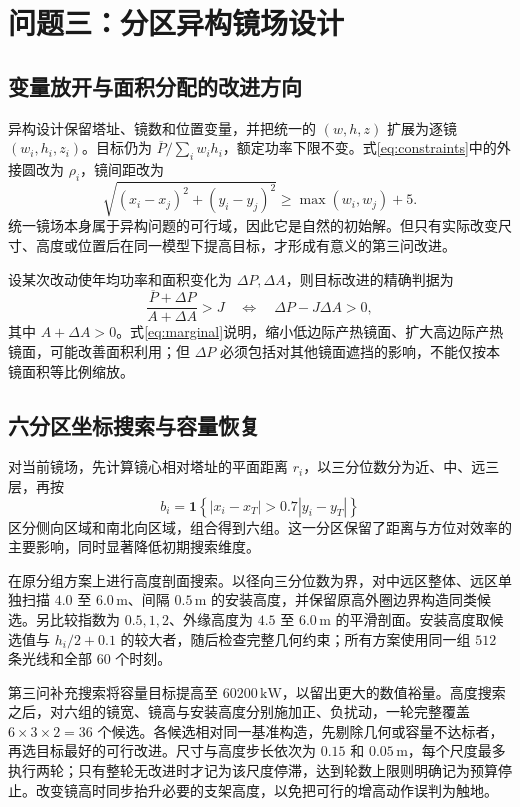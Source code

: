 \documentclass[UTF8,a4paper,zihao=-4,fontset=mac]{ctexart}
\newcommand{\mean}[1]{\overline{#1}}
\begin{document}
\section{问题三：分区异构镜场设计}
\subsection{变量放开与面积分配的改进方向}
异构设计保留塔址、镜数和位置变量，并把统一的 $(w,h,z)$ 扩展为逐镜 $(w_i,h_i,z_i)$。目标仍为 $\mean P/\sum_iw_ih_i$，额定功率下限不变。式\eqref{eq:constraints}中的外接圆改为 $\rho_i$，镜间距改为
\begin{equation}
\sqrt{(x_i-x_j)^2+(y_i-y_j)^2}\ge\max(w_i,w_j)+5.
\end{equation}
统一镜场本身属于异构问题的可行域，因此它是自然的初始解。但只有实际改变尺寸、高度或位置后在同一模型下提高目标，才形成有意义的第三问改进。

设某次改动使年均功率和面积变化为 $\Delta P,\Delta A$，则目标改进的精确判据为
\begin{equation}
\frac{\mean P+\Delta P}{A+\Delta A}>J
\quad\Longleftrightarrow\quad \Delta P-J\Delta A>0,
\label{eq:marginal}
\end{equation}
其中 $A+\Delta A>0$。式\eqref{eq:marginal}说明，缩小低边际产热镜面、扩大高边际产热镜面，可能改善面积利用；但 $\Delta P$ 必须包括对其他镜面遮挡的影响，不能仅按本镜面积等比例缩放。

\subsection{六分区坐标搜索与容量恢复}
对当前镜场，先计算镜心相对塔址的平面距离 $r_i$，以三分位数分为近、中、远三层，再按
\begin{equation}
b_i=\mathbf1\!\left\{|x_i-x_T|>0.7|y_i-y_T|\right\}
\end{equation}
区分侧向区域和南北向区域，组合得到六组。这一分区保留了距离与方位对效率的主要影响，同时显著降低初期搜索维度。

在原分组方案上进行高度剖面搜索。以径向三分位数为界，对中远区整体、远区单独扫描 $4.0$ 至 $6.0\,\mathrm m$、间隔 $0.5\,\mathrm m$ 的安装高度，并保留原高外圈边界构造同类候选。另比较指数为 $0.5,1,2$、外缘高度为 $4.5$ 至 $6.0\,\mathrm m$ 的平滑剖面。安装高度取候选值与 $h_i/2+0.1$ 的较大者，随后检查完整几何约束；所有方案使用同一组 $512$ 条光线和全部 $60$ 个时刻。

第三问补充搜索将容量目标提高至 $60200\,\mathrm{kW}$，以留出更大的数值裕量。高度搜索之后，对六组的镜宽、镜高与安装高度分别施加正、负扰动，一轮完整覆盖 $6\times3\times2=36$ 个候选。各候选相对同一基准构造，先剔除几何或容量不达标者，再选目标最好的可行改进。尺寸与高度步长依次为 $0.15$ 和 $0.05\,\mathrm m$，每个尺度最多执行两轮；只有整轮无改进时才记为该尺度停滞，达到轮数上限则明确记为预算停止。改变镜高时同步抬升必要的支架高度，以免把可行的增高动作误判为触地。
\end{document}
